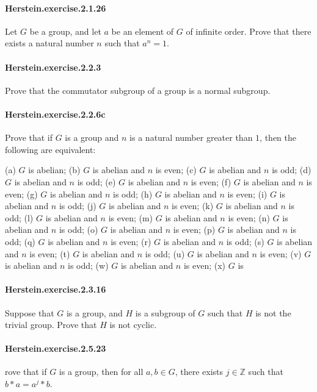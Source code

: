 \documentclass{article}
\begin{document}
\paragraph{Herstein.exercise.2.1.26} Let $G$ be a group, and let $a$ be an element of $G$ of infinite order. Prove that there exists a natural number $n$ such that $a^n = 1$.

\paragraph{Herstein.exercise.2.2.3} Prove that the commutator subgroup of a group is a normal subgroup.

\paragraph{Herstein.exercise.2.2.6c} Prove that if $G$ is a group and $n$ is a natural number greater than $1$, then the following are equivalent:

(a) $G$ is abelian;
(b) $G$ is abelian and $n$ is even;
(c) $G$ is abelian and $n$ is odd;
(d) $G$ is abelian and $n$ is odd;
(e) $G$ is abelian and $n$ is even;
(f) $G$ is abelian and $n$ is even;
(g) $G$ is abelian and $n$ is odd;
(h) $G$ is abelian and $n$ is even;
(i) $G$ is abelian and $n$ is odd;
(j) $G$ is abelian and $n$ is even;
(k) $G$ is abelian and $n$ is odd;
(l) $G$ is abelian and $n$ is even;
(m) $G$ is abelian and $n$ is even;
(n) $G$ is abelian and $n$ is odd;
(o) $G$ is abelian and $n$ is even;
(p) $G$ is abelian and $n$ is odd;
(q) $G$ is abelian and $n$ is even;
(r) $G$ is abelian and $n$ is odd;
(s) $G$ is abelian and $n$ is even;
(t) $G$ is abelian and $n$ is odd;
(u) $G$ is abelian and $n$ is even;
(v) $G$ is abelian and $n$ is odd;
(w) $G$ is abelian and $n$ is even;
(x) $G$ is

\paragraph{Herstein.exercise.2.3.16} Suppose that $G$ is a group, and $H$ is a subgroup of $G$ such that $H$ is not the trivial group. Prove that $H$ is not cyclic.

\paragraph{Herstein.exercise.2.5.23} rove that if $G$ is a group, then for all $a, b \in G$, there exists $j \in \mathbb{Z}$ such that $b*a = a^j * b$.
\end{document}
